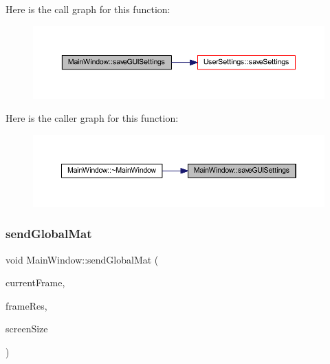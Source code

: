 Here is the call graph for this function\+:
\nopagebreak
\begin{figure}[H]
\begin{center}
\leavevmode
\includegraphics[width=350pt]{class_main_window_a0806c678c7280ab0a786526522f91418_cgraph}
\end{center}
\end{figure}
Here is the caller graph for this function\+:
\nopagebreak
\begin{figure}[H]
\begin{center}
\leavevmode
\includegraphics[width=350pt]{class_main_window_a0806c678c7280ab0a786526522f91418_icgraph}
\end{center}
\end{figure}
\mbox{\label{class_main_window_a302481f26ce2f1666e4a4dfaddacb08e}} 
\subsubsection{\texorpdfstring{sendGlobalMat}{sendGlobalMat}}
{\footnotesize\ttfamily void Main\+Window\+::send\+Global\+Mat (\begin{DoxyParamCaption}\item[{Mat}]{current\+Frame,  }\item[{Q\+Size}]{frame\+Res,  }\item[{Q\+Rect}]{screen\+Size }\end{DoxyParamCaption})\hspace{0.3cm}{\ttfamily [signal]}}

